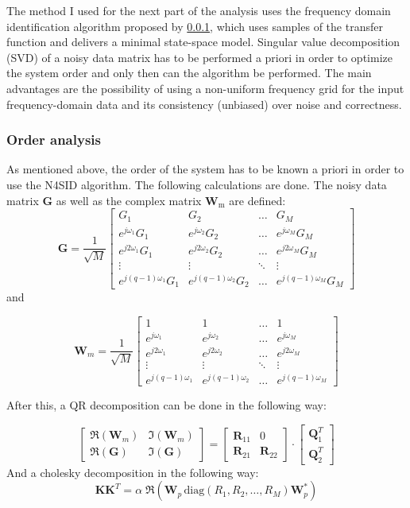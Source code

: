 The method I used for the next part of the analysis uses the frequency domain identification algorithm proposed by \ref{}, which uses samples of the transfer function and delivers a minimal state-space model. Singular value decomposition (SVD) of a noisy data matrix has to be performed a priori in order to optimize the system order and only then can the algorithm be performed. The main advantages are the possibility of using a non-uniform frequency grid for the input frequency-domain data and its consistency (unbiased) over noise and correctness. 


\subsubsection{Order analysis}

As mentioned above, the order of the system has to be known a priori in order to use the N4SID algorithm. The following calculations are done. The noisy data matrix $\textbf{G}$ as well as the complex matrix $\textbf{W}_\text{m}$ are defined:
\[
\textbf{G} = \frac{1}{\sqrt{M}}
\begin{bmatrix}
G_1 & G_2 & \dots & G_M \\
e^{j\omega_1}G_1 & e^{j\omega_2}G_2 & \dots & e^{j\omega_M}G_M \\
e^{j2\omega_1}G_1 & e^{j2\omega_2}G_2 & \dots & e^{j2\omega_M}G_M \\
\vdots & \vdots & \ddots & \vdots \\
e^{j(q-1)\omega_1}G_1 &e^{j(q-1)\omega_2} G_2 & \dots & e^{j(q-1)\omega_M}G_M 
\end{bmatrix} \]
and

\[
\textbf{W}_m = \frac{1}{\sqrt{M}}
\begin{bmatrix}
1 & 1 & \dots & 1 \\
e^{j\omega_1} & e^{j\omega_2} & \dots & e^{j\omega_M} \\
e^{j2\omega_1} & e^{j2\omega_2} & \dots & e^{j2\omega_M} \\
\vdots & \vdots & \ddots & \vdots \\
e^{j(q-1)\omega_1} &e^{j(q-1)\omega_2} & \dots & e^{j(q-1)\omega_M} 
\end{bmatrix}\]

After this, a QR decomposition can be done in the following way:

\[\begin{bmatrix}
\Re(\textbf{W}_m) & \Im(\textbf{W}_m) \\
\Re(\textbf{G}) & \Im(\textbf{G})
\end{bmatrix} = 
\begin{bmatrix}
\textbf{R}_{11} & 0 \\
\textbf{R}_{21} & \textbf{R}_{22}
\end{bmatrix}\cdot
 \begin{bmatrix}
\textbf{Q}_1^T  \\
\textbf{Q}_2^T
\end{bmatrix}
\]
And a cholesky decomposition in the following way:
\[\textbf{K}\textbf{K}^T = \alpha\;\Re(\textbf{W}_p\,\text{diag}(R_1,R_2,\dots, R_M)\textbf{W}_p^*)\]

